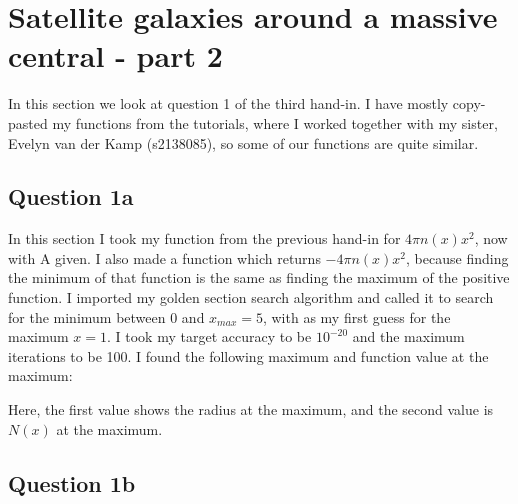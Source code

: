 \section{Satellite galaxies around a massive central - part 2}

In this section we look at question 1 of the third hand-in. 
I have mostly copy-pasted my functions from the tutorials, where I worked together with my sister,
Evelyn van der Kamp (s2138085), so some of our functions are quite similar.



\subsection{Question 1a}

In this section I took my function from the previous hand-in for $4 \pi n(x) x^2$, now with A given.
I also made a function which returns $-4 \pi n(x) x^2$, because finding the minimum of that function is the same as finding the maximum of the positive function.
I imported my golden section search algorithm and called it to search for the minimum between 0 and $x_{max} = 5$, with as my first guess for the maximum $x=1$.
I took my target accuracy to be $10^{-20}$ and the maximum iterations to be 100.
I found the following maximum and function value at the maximum:



Here, the first value shows the radius at the maximum, and the second value is $N(x)$ at the maximum.


\subsection{Question 1b}

